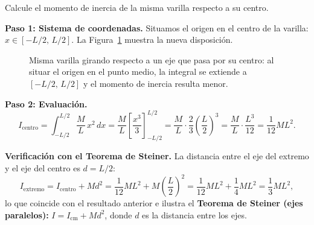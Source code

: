 
\begin{example}
Calcule el momento de inercia de la misma varilla respecto a su centro.

\begin{myproof}
\textbf{Paso 1: Sistema de coordenadas.}
Situamos el origen en el centro de la varilla: $x\in[-L/2,\,L/2]$.
La Figura~\ref{fig:inercia_varilla_centro} muestra la nueva disposición.

\begin{figure}[H]
\centering
{}
\caption{Misma varilla girando respecto a un eje que pasa por su centro: al situar el origen en el punto medio, la integral se extiende a $[-L/2,\,L/2]$ y el momento de inercia resulta menor.}
\label{fig:inercia_varilla_centro}
\end{figure}

\textbf{Paso 2: Evaluación.}
\[
  I_{\text{centro}} 
    = \int_{-L/2}^{L/2}\frac{M}{L}\,x^2\,dx
    = \frac{M}{L}\left[\frac{x^3}{3}\right]_{-L/2}^{L/2}
    = \frac{M}{L}\cdot\frac{2}{3}\left(\frac{L}{2}\right)^{\!3}
    = \frac{M}{L}\cdot\frac{L^3}{12}
    = \boxed{\dfrac{1}{12}ML^2}.
\]

\textbf{Verificación con el Teorema de Steiner.}
La distancia entre el eje del extremo y el eje del centro es $d=L/2$:
\[
  I_{\text{extremo}}
    = I_{\text{centro}} + M d^2
    = \frac{1}{12}ML^2 + M\!\left(\frac{L}{2}\right)^{\!2}
    = \frac{1}{12}ML^2 + \frac{1}{4}ML^2
    = \frac{1}{3}ML^2,
\]
lo que coincide con el resultado anterior e ilustra el
\textbf{Teorema de Steiner (ejes paralelos):}
$I = I_{\text{cm}} + Md^2$, donde $d$ es la distancia entre los ejes.
\end{myproof}
\end{example}

